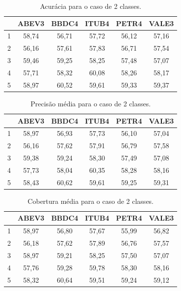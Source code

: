 \documentclass[grad,numbers]{coppe}
\begin{document}
 			\begin{table}[h]
 				\caption{Acurácia para o caso de 2 classes.}
 				\label{tab:2c_ac_analysis}
 				\centering
 				{\footnotesize
 					\begin{tabular}{|c|c|c|c|c|c|}
 						\hline
 						\diagbox[linewidth=0.2pt, width=\dimexpr \textwidth/10+2\tabcolsep\relax, height=0.8cm]{Dias}{Ativo}
 						& ABEV3 & BBDC4 & ITUB4 & PETR4 & VALE3\\
 						\hline
 						1 & 58,74 & 56,71 & 57,72 & 56,12 & 57,16 \\
 						2 & 56,16 & 57,61 & 57,83 & 56,71 & 57,54 \\
 						3 & 59,46 & 59,25 & 58,25 & 57,48 & 57,07 \\
 						4 & 57,71 & 58,32 & 60,08 & 58,26 & 58,17 \\
 						5 & 58,97 & 60,52 & 59,61 & 59,33 & 59,37 \\
 						\hline
 				\end{tabular}}
 			\end{table}
 			\begin{table}[h]
 				\caption{Precisão média para o caso de 2 classes.}
 				\label{tab:2c_pr_analysis}
 				\centering
 				{\footnotesize
 					\begin{tabular}{|c|c|c|c|c|c|}
 						\hline
 						\diagbox[linewidth=0.2pt, width=\dimexpr \textwidth/10+2\tabcolsep\relax, height=0.8cm]{Dias}{Ativo}
 						& ABEV3 & BBDC4 & ITUB4 & PETR4 & VALE3\\
 						\hline
 						1 & 58,97 & 56,93 & 57,73 & 56,10 & 57,04 \\
 						2 & 56,16 & 57,62 & 57,91 & 56,79 & 57,58 \\
 						3 & 59,38 & 59,24 & 58,30 & 57,49 & 57,08 \\
 						4 & 57,73 & 58,04 & 60,35 & 58,28 & 58,16 \\
 						5 & 58,43 & 60,62 & 59,61 & 59,25 & 59,31 \\
 						\hline
 				\end{tabular}}
 			\end{table}
 			\begin{table}[h]
	 				\caption{Cobertura média para o caso de 2 classes.}
	 				\label{tab:2c_co_analysis}
	 				\centering
	 				{\footnotesize
	 					\begin{tabular}{|c|c|c|c|c|c|}
	 						\hline
	 						\diagbox[linewidth=0.2pt, width=\dimexpr \textwidth/10+2\tabcolsep\relax, height=0.8cm]{Dias}{Ativo}
	 						& ABEV3 & BBDC4 & ITUB4 & PETR4 & VALE3\\
	 						\hline
	 						1 & 58,97 & 56,80 & 57,67 & 55,99 & 56,82 \\
	 						2 & 56,18 & 57,62 & 57,89 & 56,76 & 57,57 \\
	 						3 & 58,97 & 59,21 & 58,25 & 57,50 & 57,07 \\
	 						4 & 57,76 & 59,28 & 59,78 & 58,30 & 58,16 \\
	 						5 & 58,32 & 60,64 & 59,51 & 59,24 & 59,12 \\
	 						\hline
	 				\end{tabular}}
	 			\end{table}
\end{document}
